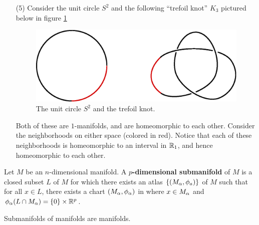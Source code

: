 \begin{example}
\begin{enumerate}
             \item[(5)] Consider the unit circle $S^2$ and the following
                 ``trefoil knot'' $K_3$ pictured below in figure \ref{figure_1.3}
                 \begin{figure}[h]
                     \centering
                     \includegraphics[scale=0.5]{Figures/Chapter1/circle_to_trefoil.eps}
                     \caption{The unit circle $S^2$ and the trefoil knot.}
                     \label{figure_1.3}
                 \end{figure}
                 Both of these are $1$-manifolds, and are homeomorphic to each
                 other. Consider the neighborhoods on either space  (colored in
                 red). Notice that each of these neighborhoods is homeomorphic
                 to an interval in $\mathbb{R}_1$, and hence homeomorphic to each other.
    \end{enumerate}
\end{example}

\begin{definition}
    Let $M$ be an  $n$-dimensional manifold. A  \textbf{$p$-dimensional
    submanifold} of $M$ is a closed subset  $L$ of  $M$ for which there exists
    an atlas  $\{(M_\alpha,\phi_a)\}$ of $M$ such that for all  $x \in L$, there
    exists a chart  $(M_\alpha,\phi_\alpha)$ in where $x \in M_\alpha$ and  $\phi_\alpha(L \cap
    M_\alpha)=\{0\} \times \mathbb{R}^p$.
\end{definition}

\begin{lemma}\label{1.1.1}
    Submanifolds of manifolds are manifolds.
\end{lemma}

